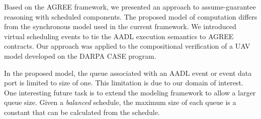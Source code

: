 Based on the AGREE framework, we presented an approach to assume-guarantee reasoning with scheduled components. The proposed model of computation differs from the synchronous model used in the current framework. We introduced virtual scheduling events to tie the AADL execution semantics to AGREE contracts. Our approach was applied to the compositional verification of a UAV model developed on the DARPA CASE program.

In the proposed model, the queue associated with an AADL event or event data port is limited to size of one. This limitation is due to our domain of interest. One interesting future task is to extend the modeling framework to allow a larger queue size. Given a \emph{balanced} schedule, the maximum size of each queue is a constant that can be calculated from the schedule.